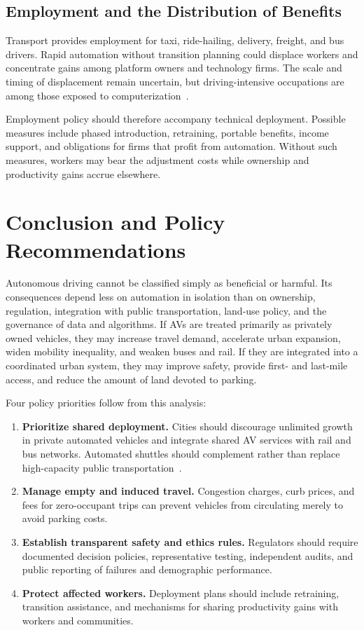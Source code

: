 \documentclass[12pt,a4paper]{article}
\begin{document}
\subsection{Employment and the Distribution of Benefits}

Transport provides employment for taxi, ride-hailing, delivery, freight, and bus drivers. Rapid automation without transition planning could displace workers and concentrate gains among platform owners and technology firms. The scale and timing of displacement remain uncertain, but driving-intensive occupations are among those exposed to computerization~\citep{frey2017}.

Employment policy should therefore accompany technical deployment. Possible measures include phased introduction, retraining, portable benefits, income support, and obligations for firms that profit from automation. Without such measures, workers may bear the adjustment costs while ownership and productivity gains accrue elsewhere.

\section{Conclusion and Policy Recommendations}

Autonomous driving cannot be classified simply as beneficial or harmful. Its consequences depend less on automation in isolation than on ownership, regulation, integration with public transportation, land-use policy, and the governance of data and algorithms. If AVs are treated primarily as privately owned vehicles, they may increase travel demand, accelerate urban expansion, widen mobility inequality, and weaken buses and rail. If they are integrated into a coordinated urban system, they may improve safety, provide first- and last-mile access, and reduce the amount of land devoted to parking.

Four policy priorities follow from this analysis:

\begin{enumerate}[label=\arabic*.,leftmargin=2em]
  \item \textbf{Prioritize shared deployment.} Cities should discourage unlimited growth in private automated vehicles and integrate shared AV services with rail and bus networks. Automated shuttles should complement rather than replace high-capacity public transportation~\citep{sperling2018}.
  \item \textbf{Manage empty and induced travel.} Congestion charges, curb prices, and fees for zero-occupant trips can prevent vehicles from circulating merely to avoid parking costs.
  \item \textbf{Establish transparent safety and ethics rules.} Regulators should require documented decision policies, representative testing, independent audits, and public reporting of failures and demographic performance.
  \item \textbf{Protect affected workers.} Deployment plans should include retraining, transition assistance, and mechanisms for sharing productivity gains with workers and communities.
\end{enumerate}
\end{document}
